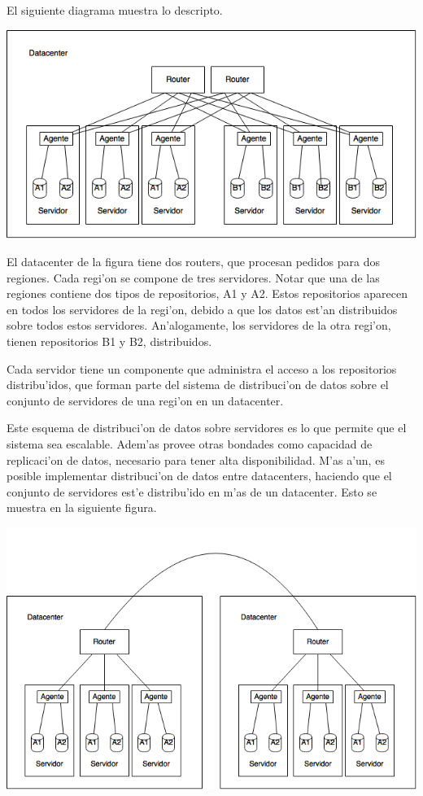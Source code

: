 El siguiente diagrama muestra lo descripto. 

\includegraphics[width=15cm]{diagramas/datacenter.png}

\noindent
El datacenter de la figura tiene dos routers, que procesan pedidos para dos regiones. Cada regi'on se compone de tres servidores. Notar que una de las regiones contiene dos tipos de repositorios, A1 y A2. Estos repositorios aparecen en todos los servidores de la regi'on, debido a que los datos est'an distribuidos sobre todos estos servidores. An'alogamente, los servidores de la otra regi'on, tienen repositorios B1 y B2, distribuidos.

Cada servidor tiene un componente que administra el acceso a los repositorios distribu'idos, que forman parte del sistema de distribuci'on de datos sobre el conjunto de servidores de una regi'on en un datacenter.

Este esquema de distribuci'on de datos sobre servidores es lo que permite que el sistema sea escalable. Adem'as provee otras bondades como capacidad de replicaci'on de datos, necesario para tener alta disponibilidad. M'as a'un, es posible implementar distribuci'on de datos entre datacenters, haciendo que el conjunto de servidores est'e distribu'ido en m'as de un datacenter. Esto se muestra en la siguiente figura.

\includegraphics[width=15cm]{diagramas/datacenterx2.png}

